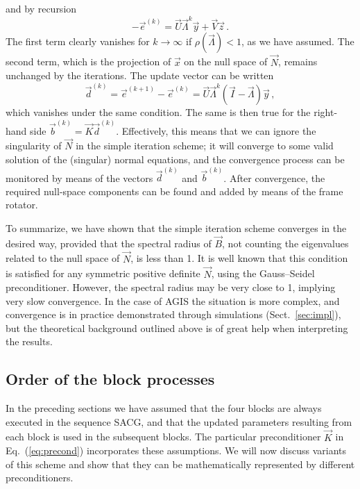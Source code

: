 \documentclass[structabstract]{aa}
\begin{document}
and by recursion
\begin{equation}\label{eq:ekdecomp}
-\vec{e}^{(k)} = \vec{U}\vec{\Lambda}^k\vec{y}+\vec{V}\vec{z} \, .
\end{equation}
The first term clearly vanishes for $k\rightarrow\infty$ if
$\rho(\vec{\Lambda})<1$, as we have assumed. The second term,
which is the projection of $\vec{x}$ on the null space of $\vec{N}$,
remains unchanged by the iterations. The update vector can be written
\begin{equation}\label{eq:deltakdecomp}
\vec{d}^{(k)} = \vec{e}^{(k+1)} - \vec{e}^{(k)} =
\vec{U}\vec{\Lambda}^k(\vec{I}-\vec{\Lambda})\vec{y} \, ,
\end{equation}
which vanishes under the same condition. The same is then true
for the right-hand side $\vec{b}^{(k)}=\vec{K}\vec{d}^{(k)}$.
Effectively, this means that we can ignore the singularity of $\vec{N}$
in the simple iteration scheme; it will converge to some valid solution
of the (singular) normal equations, and the convergence process can be
monitored by means of the vectors $\vec{d}^{(k)}$ and $\vec{b}^{(k)}$.
After convergence, the required null-space components can be found
and added by means of the frame rotator.

To summarize, we have shown that the simple iteration scheme converges
in the desired way, provided that the spectral radius of $\vec{B}$, not
counting the eigenvalues related to the null space of $\vec{N}$, is less
than 1. It is well known \citep[e.g.,][]{golu+96} that this condition is
satisfied for any symmetric positive definite $\vec{N}$, using the 
Gauss--Seidel preconditioner. However, the spectral radius may be very 
close to 1, implying very slow convergence. In the case of AGIS the 
situation is more complex, and convergence is in practice demonstrated 
through simulations (Sect.~\ref{sec:impl}), but the theoretical background 
outlined above is of great help when interpreting the results.

\subsection{Order of the block processes}\label{sec:order}

In the preceding sections we have assumed that the four blocks are
always executed in the sequence SACG, and that the updated parameters
resulting from each block is used in the subsequent blocks. The
particular preconditioner $\vec{K}$ in Eq.~(\ref{eq:precond})
incorporates these assumptions. We will now discuss variants of this
scheme and show that they can be mathematically represented by
different preconditioners.
\end{document}
